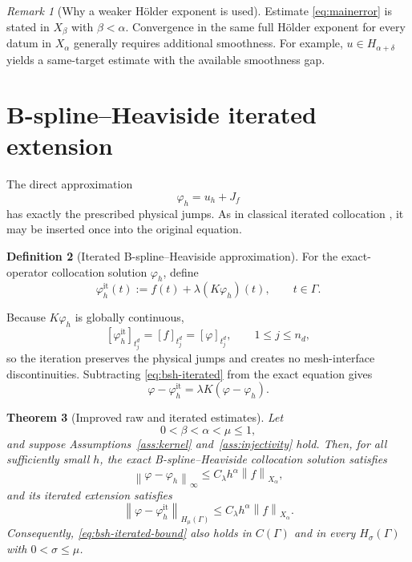 \documentclass[11pt,a4paper]{amsart}
\theoremstyle{plain}
\newtheorem{theorem}{Theorem}[section]
\theoremstyle{definition}
\newtheorem{definition}[theorem]{Definition}
\theoremstyle{remark}
\newtheorem{remark}[theorem]{Remark}
\newcommand{\Ga}{\Gamma}
\newcommand{\norm}[1]{\left\|#1\right\|}
\begin{document}
\begin{remark}[Why a weaker H\"older exponent is used]\label{rem:nonsame}
Estimate \eqref{eq:mainerror} is stated in $X_\beta$ with $\beta<\alpha$.
Convergence in the same full H\"older exponent for every datum in
$X_\alpha$ generally requires additional smoothness.  For example,
$u\in H_{\alpha+\delta}$ yields a same-target estimate with the available
smoothness gap.
\end{remark}


\section{B-spline--Heaviside iterated extension}\label{sec:iterated}

The direct approximation
\[
        \varphi_h=u_h+J_f
\]
has exactly the prescribed physical jumps.  As in classical iterated
collocation \cite{AtkinsonGrahamSloan,Joe1985,GrahamJoeSloan1985}, it may be
inserted once into the original equation.

\begin{definition}[Iterated B-spline--Heaviside approximation]
\label{def:bsh-iterated}
For the exact-operator collocation solution $\varphi_h$, define
\begin{equation}\label{eq:bsh-iterated}
        \varphi_h^{\mathrm{it}}(t)
        :=f(t)+\lambda(K\varphi_h)(t),
        \qquad t\in\Ga.
\end{equation}
\end{definition}

Because $K\varphi_h$ is globally continuous,
\begin{equation}\label{eq:bsh-iterated-jumps}
        [\varphi_h^{\mathrm{it}}]_{t_j^d}
        =[f]_{t_j^d}
        =[\varphi]_{t_j^d},
        \qquad 1\le j\le n_d,
\end{equation}
so the iteration preserves the physical jumps and creates no mesh-interface
discontinuities.  Subtracting \eqref{eq:bsh-iterated} from the exact equation
gives
\begin{equation}\label{eq:bsh-iterated-error-identity}
        \varphi-\varphi_h^{\mathrm{it}}
        =\lambda K(\varphi-\varphi_h).
\end{equation}

\begin{theorem}[Improved raw and iterated estimates]
\label{thm:bsh-iterated}
Let
\[
        0<\beta<\alpha<\mu\le1,
\]
and suppose Assumptions~\ref{ass:kernel} and~\ref{ass:injectivity} hold.
Then, for all sufficiently small $h$, the exact B-spline--Heaviside
collocation solution satisfies
\begin{equation}\label{eq:bsh-raw-sup}
        \norm{\varphi-\varphi_h}_{\infty}
        \le
        C_\lambda h^\alpha\norm{f}_{X_\alpha},
\end{equation}
and its iterated extension satisfies
\begin{equation}\label{eq:bsh-iterated-bound}
        \norm{\varphi-\varphi_h^{\mathrm{it}}}_{H_\mu(\Ga)}
        \le
        C_\lambda h^\alpha\norm{f}_{X_\alpha}.
\end{equation}
Consequently, \eqref{eq:bsh-iterated-bound} also holds in $C(\Ga)$ and in every $H_\sigma(\Ga)$ with $0<\sigma\le\mu$.
\end{theorem}
\end{document}
